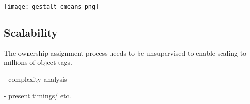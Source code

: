 \begin{figure*}[ht]
\label{fig:cmeans}        
\texttt{[image: gestalt\_cmeans.png]}
\centering
\caption[width=\textwidth]{............}
\end{figure*}


\subsection{Scalability}
The ownership assignment process needs to be unsupervised to enable scaling to millions of object tags. 

- complexity analysis

- present timings/ etc.








 
